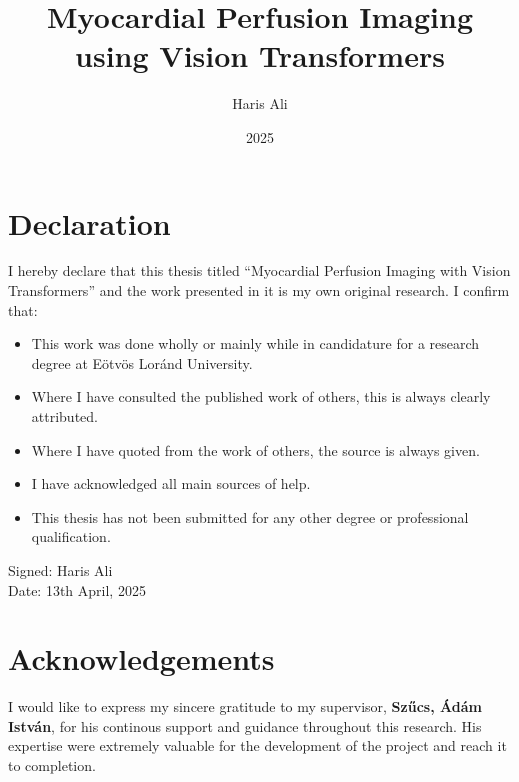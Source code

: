 \documentclass[
]{elteikthesis}[2024/04/26]
\title{Myocardial Perfusion Imaging using Vision Transformers} %
\date{2025} %
\author{Haris Ali}
\affiliation{PhD Candidate} %
\begin{document}


\maketitle
%

\chapter*{Declaration}

I hereby declare that this thesis titled “Myocardial Perfusion Imaging with Vision Transformers” and the work presented in it is my own original research. I confirm that:

\begin{itemize}
    \item This work was done wholly or mainly while in candidature for a research degree at Eötvös Loránd University.
    \item Where I have consulted the published work of others, this is always clearly attributed.
    \item Where I have quoted from the work of others, the source is always given.
    \item I have acknowledged all main sources of help.
    \item This thesis has not been submitted for any other degree or professional qualification.
\end{itemize}

\vspace{1cm}
\noindent
Signed: Haris Ali \\
\vspace{0.2cm}
Date: 13th April, 2025


\chapter*{Acknowledgements}

I would like to express my sincere gratitude to my supervisor, \textbf{Szűcs, Ádám István}, for his continous support and guidance throughout this research. His expertise were extremely valuable for the development of the project and reach it to completion.
\end{document}
